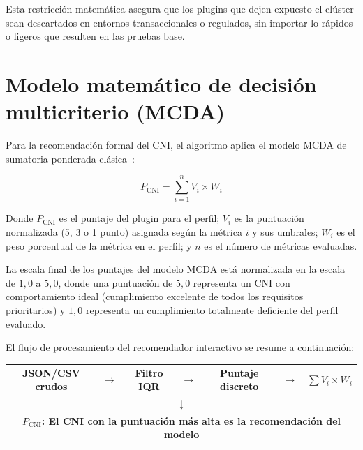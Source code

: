 Esta restricción matemática asegura que los plugins que dejen expuesto el clúster sean descartados en entornos transaccionales o regulados, sin importar lo rápidos o ligeros que resulten en las pruebas base.

\section{Modelo matemático de decisión multicriterio (MCDA)} \label{sec:apb_mcda}

Para la recomendación formal del CNI, el algoritmo aplica el modelo MCDA de sumatoria ponderada clásica~\cite{ref9}:

\begin{equation}
  P_{\text{CNI}} = \sum_{i=1}^{n} V_i \times W_i
  \label{eq:mcda-formula}
\end{equation}

Donde $P_{\text{CNI}}$ es el puntaje del plugin para el perfil; $V_i$ es la puntuación normalizada (5, 3 o 1 punto) asignada según la métrica $i$ y sus umbrales; $W_i$ es el peso porcentual de la métrica en el perfil; y $n$ es el número de métricas evaluadas. 

La escala final de los puntajes del modelo MCDA está normalizada en la escala de $1,0$ a $5,0$, donde una puntuación de $5,0$ representa un CNI con comportamiento ideal (cumplimiento excelente de todos los requisitos prioritarios) y $1,0$ representa un cumplimiento totalmente deficiente del perfil evaluado.

El flujo de procesamiento del recomendador interactivo se resume a continuación:

\begin{center}
  \begin{tabular}{ccccccc}
    \colorbox{oe3azulcl}{\small\textbf{JSON/CSV crudos}} &
    $\rightarrow$ &
    \colorbox{oe3griscl}{\small\textbf{Filtro IQR}} &
    $\rightarrow$ &
    \colorbox{oe3griscl}{\small\textbf{Puntaje discreto}} &
    $\rightarrow$ &
    \colorbox{oe3verdecl}{\small\textbf{$\sum V_i \times W_i$}} \\[6pt]
    \multicolumn{7}{c}{$\downarrow$} \\[4pt]
    \multicolumn{7}{c}{\colorbox{oe3azulcl}{\small\textbf{$P_{\text{CNI}}$: El CNI con la puntuación más alta es la recomendación del modelo}}}
  \end{tabular}
\end{center}

